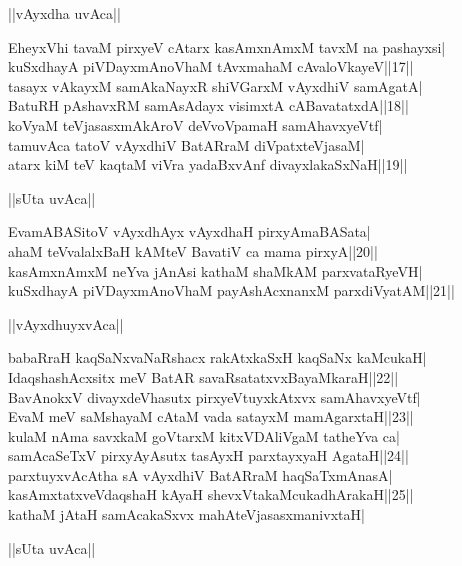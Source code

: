 \documentclass{article}
\begin{document}
\begin{center}
||vAyxdha uvAca||
\end{center}

EheyxVhi tavaM pirxyeV cAtarx kasAmxnAmxM tavxM na pashayxsi|\\
kuSxdhayA piVDayxmAnoVhaM tAvxmahaM cAvaloVkayeV||17||\\
tasayx vAkayxM samAkaNayxR shiVGarxM vAyxdhiV samAgatA|\\
BatuRH pAshavxRM samAsAdayx visimxtA cABavatatxdA||18||\\
koVyaM teVjasasxmAkAroV deVvoVpamaH samAhavxyeVtf|\\
tamuvAca tatoV vAyxdhiV BatARraM diVpatxteVjasaM|\\
atarx kiM teV kaqtaM viVra yadaBxvAnf divayxlakaSxNaH||19||\\

\begin{center}
||sUta uvAca||
\end{center}

EvamABASitoV vAyxdhAyx vAyxdhaH pirxyAmaBASata|\\
ahaM teVvalalxBaH kAMteV BavatiV ca mama pirxyA||20||\\
kasAmxnAmxM neYva jAnAsi kathaM shaMkAM parxvataRyeVH|\\
kuSxdhayA piVDayxmAnoVhaM payAshAcxnanxM parxdiVyatAM||21||\\

\begin{center}
||vAyxdhuyxvAca||
\end{center}

babaRraH kaqSaNxvaNaRshacx rakAtxkaSxH kaqSaNx kaMcukaH|\\
IdaqshashAcxsitx meV BatAR savaRsatatxvxBayaMkaraH||22||\\
BavAnokxV divayxdeVhasutx pirxyeVtuyxkAtxvx samAhavxyeVtf|\\
EvaM meV saMshayaM cAtaM vada satayxM mamAgarxtaH||23||\\
kulaM nAma savxkaM goVtarxM kitxVDAliVgaM tatheYva ca|\\
samAcaSeTxV pirxyAyAsutx tasAyxH parxtayxyaH AgataH||24||\\
parxtuyxvAcAtha sA vAyxdhiV BatARraM haqSaTxmAnasA|\\
kasAmxtatxveVdaqshaH kAyaH shevxVtakaMcukadhArakaH||25||\\
kathaM jAtaH samAcakaSxvx mahAteVjasasxmanivxtaH|\\

\begin{center}
||sUta uvAca||
\end{center}
\end{document}
